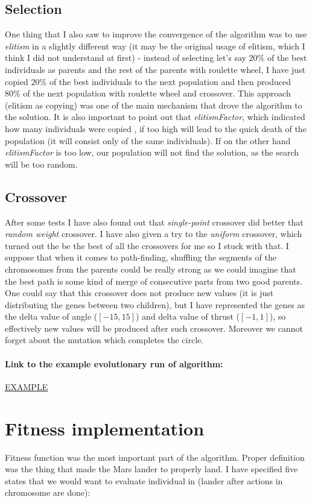 \documentclass[11pt]{article}
\begin{document}
	\subsection{Selection}
	One thing that I also saw to improve the convergence of the algorithm was to use \textit{elitism} in a slightly different way (it may be the original usage of elitism, which I think I did not understand at first) - instead of selecting let's say $20\%$ of the best individuals as parents and the rest of the parents with roulette wheel, I have just copied $20\%$ of the best individuals to the next population and then produced $80\%$ of the next population with roulette wheel and crossover. This approach (elitism as copying) was one of the main mechanism that drove the algorithm to the solution. It is also important to point out that \textit{elitismFactor}, which indicated how many individuals were copied , if too high will lead to the quick death of the population (it will consist only of the same individuals). If on the other hand \textit{elitismFactor} is too low, our population will not find the solution, as the search will be too random.
	
	\subsection{Crossover}
	After some tests I have also found out that \textit{single-point} crossover did better that \textit{random weight} crossover. I have also given a try to the \textit{uniform} crossover, which turned out the be the best of all the crossovers for me so I stuck with that. I suppose that when it comes to path-finding, shuffling the segments of the chromosomes from the parents could be really strong as we could imagine that the best path is some kind of merge of consecutive parts from two good parents. One could say that this crossover does not produce new values (it is just distributing the genes between two children), but I have represented the genes as the delta value of angle ($[-15,15]$) and delta value of thrust ($[-1,1]$), so effectively new values will be produced after such crossover. Moreover we cannot forget about the mutation which completes the circle.
	
	\paragraph{Link to the example evolutionary run of algorithm: }
	\href{https://gph.is/g/Z86B130}{EXAMPLE}
	
	\section{Fitness implementation}
	Fitness function was the most important part of the algorithm. Proper definition was the thing that made the Mars lander to properly land. I have specified five states that we would want to evaluate individual in (lander after actions in chromosome are done):\\
	
\end{document}

